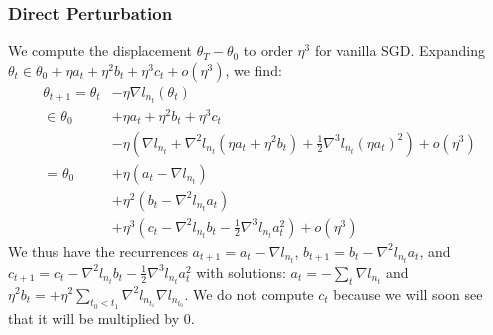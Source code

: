 \documentclass{article}
\theoremstyle{plain}
\theoremstyle{definition}
\newcommand{\wrap}[1]{\left(#1\right)}
\begin{document}
        \subsubsection*{Direct Perturbation}
        \begin{shaded}
            We compute the displacement $\theta_T-\theta_0$ to order $\eta^3$ 
            for vanilla SGD.  Expanding
            $
                \theta_t \in \theta_0 + \eta a_t + \eta^2 b_t + \eta^3 c_t 
                + o(\eta^3)
            $, we find:
            \begin{align*}
                \theta_{t+1}
                =
                \theta_t    &-  \eta \nabla l_{n_t} (\theta_t) \\
                \in\theta_0 &+  \eta a_t + \eta^2 b_t + \eta^3 c_t \\
                            &-  \eta \wrap{
                                     \nabla l_{n_t}
                                    +\nabla^2 l_{n_t} (\eta a_t + \eta^2 b_t)
                                    +\frac{1}{2} \nabla^3 l_{n_t} (\eta a_t)^2
                                }
                             +  o(\eta^3) \\
                =
                \theta_0    &+   \eta   \wrap{a_t - \nabla l_{n_t}} \\
                            &+   \eta^2 \wrap{b_t - \nabla^2 l_{n_t} a_t} \\ 
                            &+   \eta^3 \wrap{
                                     c_t
                                    -\nabla^2 l_{n_t} b_t
                                    -\frac{1}{2} \nabla^3 l_{n_t} a_t^2
                                 }
                             +   o(\eta^3)
            \end{align*}
            We thus have the recurrences
            $
                a_{t+1} = a_t - \nabla l_{n_t}
            $,
            $
                b_{t+1} = b_t - \nabla^2 l_{n_t} a_t
            $, and
            $
                c_{t+1} = c_t -\nabla^2 l_{n_t} b_t 
                              -\frac{1}{2} \nabla^3 l_{n_t} a_t^2
            $
            with solutions:
            $a_t = -\sum_{t} \nabla l_{n_t}$ and
            $\eta^2 b_t = +\eta^2 \sum_{t_0 < t_1} \nabla^2 l_{n_{t_1}} \nabla l_{n_{t_0}}$.
            We do not compute $c_t$ because we will soon see that it will be
            multiplied by $0$.


\end{shaded}
\end{document}
